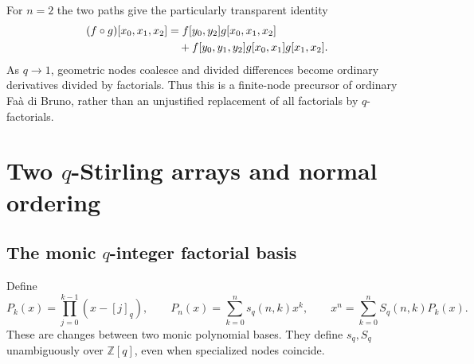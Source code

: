 \documentclass[11pt,a4paper,oneside,openany]{book}
\theoremstyle{definition}
\theoremstyle{remark}
\newcommand{\Z}{\mathbb Z}
\newcommand{\qbname}{\texorpdfstring{$q$}{q}}
\begin{document}
For $n=2$ the two paths give the particularly transparent identity
\begin{align}
 (f\circ g)[x_0,x_1,x_2]
 &=f[y_0,y_2]g[x_0,x_1,x_2] \notag\\
 &\quad+f[y_0,y_1,y_2]g[x_0,x_1]g[x_1,x_2].
 \label{q3:eq:dd-chain-two}
\end{align}
As $q\to1$, geometric nodes coalesce and divided differences become
ordinary derivatives divided by factorials. Thus this is a finite-node
precursor of ordinary Fa\`a di Bruno, rather than an unjustified
replacement of all factorials by $q$-factorials.
\chapter{Two \qbname-Stirling arrays and normal ordering}
\label{q1:qcc:qstirling}
\section{The monic \qbname-integer factorial basis}
Define
\begin{equation}\label{q1:qcc:qstirling-basis}
 P_k(x)=\prod_{j=0}^{k-1}(x-[j]_q),\qquad
 P_n(x)=\sum_{k=0}^n s_q(n,k)x^k,\qquad
 x^n=\sum_{k=0}^n S_q(n,k)P_k(x).
\end{equation}
These are changes between two monic polynomial bases. They define \(s_q,S_q\)
unambiguously over \(\Z[q]\), even when specialized nodes coincide.
\end{document}

